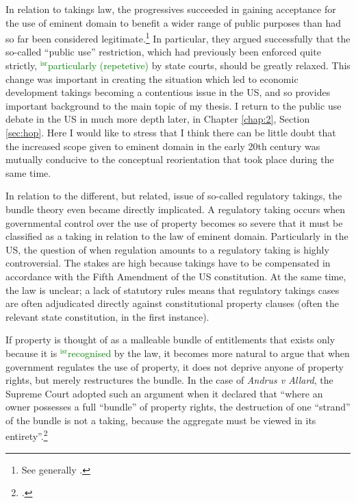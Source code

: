 \documentclass[12pt,a4paper]{book} %
\newcommand{\isr}[1]{\textcolor{green}{$^{\textrm{isr}}${#1}}}
\begin{document}
In relation to takings law, the progressives succeeded in gaining acceptance for the use of eminent domain to benefit a wider range of public purposes than had so far been considered legitimate.\footnote{See generally \cite{yale49}.} In particular, they argued successfully that the so-called ``public use'' restriction, which had previously been enforced quite strictly, \isr{particularly (repetetive)} by state courts, should be greatly relaxed. This change was important in creating the situation which led to economic development takings becoming a contentious issue in the US, and so provides important background to the main topic of my thesis.  I return to the public use debate in the US in much more depth later, in Chapter \ref{chap:2}, Section \ref{sec:hop}. Here I would like to stress that I think there can be little doubt that the increased scope given to eminent domain in the early 20th century was mutually conducive to the conceptual reorientation that took place during the same time.

In relation to the different, but related, issue of so-called regulatory takings, the bundle theory even  became directly implicated. A regulatory taking occurs when governmental control over the use of property becomes so severe that it must be classified as a taking in relation to the law of eminent domain. Particularly in the US, the question of when regulation amounts to a regulatory taking is highly controversial. The stakes are high because takings have to be compensated in accordance with the Fifth Amendment of the US constitution. At the same time, the law is unclear; a lack of statutory rules means that regulatory takings cases are often adjudicated directly against constitutional property clauses (often the relevant state constitution, in the first instance).

If property is thought of as a malleable bundle of entitlements that exists only because it is \isr{recognised} by the law, it becomes more natural to argue that when government regulates the use of property, it does not deprive anyone of property rights, but merely restructures the bundle. In the case of {\it Andrus v Allard}, the Supreme Court adopted such an argument when it declared that ``where an owner possesses a full ``bundle'' of property rights, the destruction of one ``strand'' of the bundle is not a taking, because the aggregate must be viewed in its entirety''.\footcite[65--66]{andrus79}
\end{document}
